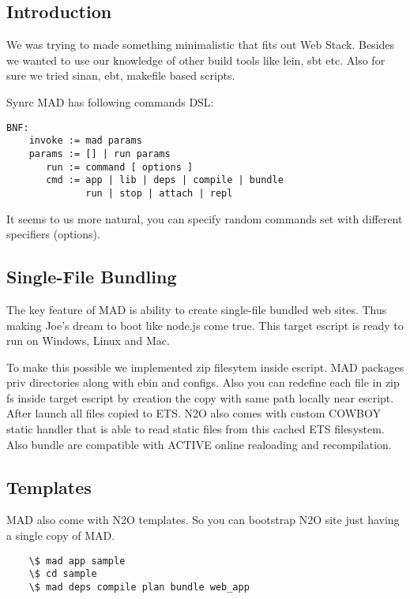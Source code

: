 \subsection{Introduction}

We was trying to made something minimalistic that fits out Web Stack.
Besides we wanted to use our knowledge of other build tools like lein, sbt etc.
Also for sure we tried sinan, ebt, makefile based scripts.

Synrc MAD has following commands DSL:

\vspace{1\baselineskip}
\begin{lstlisting}
BNF:
    invoke := mad params
    params := [] | run params
       run := command [ options ]
       cmd := app | lib | deps | compile | bundle
              run | stop | attach | repl
\end{lstlisting}
\vspace{1\baselineskip}

It seems to us more natural, you can specify random
commands set with different specifiers (options).

\subsection{Single-File Bundling}

The key feature of MAD is ability to create single-file bundled web sites.
Thus making Joe's dream to boot like node.js come true.
This target escript is ready to run on Windows, Linux and Mac.

To make this possible we implemented zip filesytem inside escript.
MAD packages priv directories along with ebin and configs.
Also you can redefine each file in zip fs inside target
escript by creation the copy with same path locally near escript.
After launch all files copied to ETS.
N2O also comes with custom COWBOY static handler that is able to
read static files from this cached ETS filesystem.
Also bundle are compatible with ACTIVE online realoading and recompilation.

\subsection{Templates}

MAD also come with N2O templates. So you can bootstrap N2O site
just having a single copy of MAD.

\vspace{1\baselineskip}
\begin{lstlisting}
    \$ mad app sample
    \$ cd sample
    \$ mad deps compile plan bundle web_app
\end{lstlisting}
\vspace{1\baselineskip}

